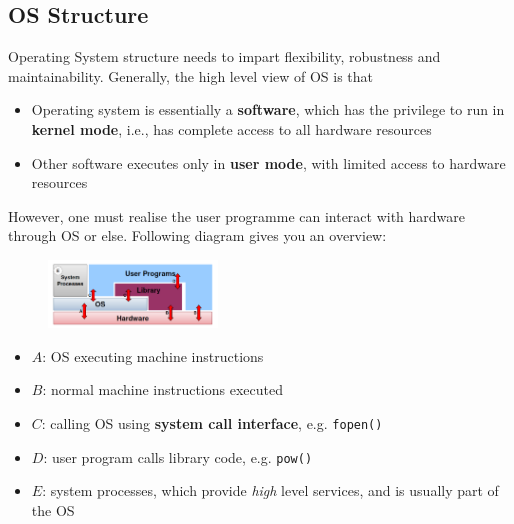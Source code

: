 \documentclass[12pt]{article}
\theoremstyle{definition}
\begin{document}
\subsection{OS Structure}
Operating System structure needs to impart flexibility, robustness and maintainability. Generally, the high level view of OS is that
\begin{itemize}
  \item Operating system is essentially a \textbf{software}, which has the privilege to run in \textbf{kernel mode}, i.e., has complete access to all hardware resources
  \item Other software executes only in \textbf{user mode}, with limited access to hardware resources
\end{itemize}
However, one must realise the user programme can interact with hardware through OS or else. Following diagram gives you an overview:
\begin{figure}[h]
\centering
\includegraphics[width = 0.4\textwidth]{1_5.png}
\end{figure}
\begin{itemize}
  \item $A$: OS executing machine instructions
  \item $B$: normal machine instructions executed
  \item $C$: calling OS using \textbf{system call interface}, e.g. \texttt{fopen()}
  \item $D$: user program calls library code, e.g. \texttt{pow()}
  \item $E$: system processes, which provide \textit{high} level services, and is usually part of the OS
\end{itemize}
\end{document}
